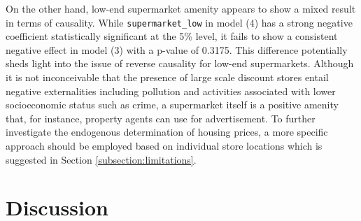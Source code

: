 \documentclass{article}
\begin{document}
On the other hand, low-end supermarket amenity appears to show a mixed result in terms of causality. While \texttt{supermarket\_low} in model (4) has a strong negative coefficient statistically significant at the 5\% level, it fails to show a consistent negative effect in model (3) with a p-value of 0.3175. This difference potentially sheds light into the issue of reverse causality for low-end supermarkets. Although it is not inconceivable that the presence of large scale discount stores entail negative externalities including pollution and activities associated with lower socioeconomic status such as crime, a supermarket itself is a positive amenity that, for instance, property agents can use for advertisement. To further investigate the endogenous determination of housing prices, a more specific approach should be employed based on individual store locations which is suggested in Section \ref{subsection:limitations}.
    
\section{Discussion} \label{section:discussion}
\end{document}
